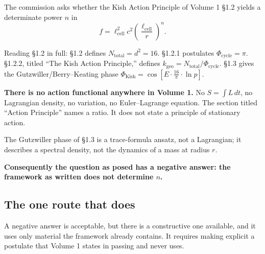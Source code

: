 \documentclass[11pt,letterpaper]{article}
\newcommand{\kgeo}{k_{\mathrm{geo}}}
\newcommand{\lcell}{\ell_{\mathrm{cell}}}
\begin{document}
The commission asks whether the Kish Action Principle of Volume 1 \S1.2 yields a determinate
power $n$ in
\begin{equation}
f = \lcell^2 c^2 \left(\frac{\lcell}{r}\right)^{n}.
\label{eq:power}
\end{equation}

Reading \S1.2 in full: \S1.2 defines $N_{\mathrm{total}} = d^2 = 16$. \S1.2.1 postulates
$\Phi_{\mathrm{cycle}} = \pi$. \S1.2.2, titled ``The Kish Action Principle,'' defines
$\kgeo = N_{\mathrm{total}}/\Phi_{\mathrm{cycle}}$. \S1.3 gives the Gutzwiller/Berry--Keating
phase $\Phi_{\mathrm{Kish}} = \cos[E \cdot \tfrac{16}{\pi} \cdot \ln p]$.

\begin{negbox}
\textbf{There is no action functional anywhere in Volume 1.} No $S = \int L\,dt$, no
Lagrangian density, no variation, no Euler--Lagrange equation. The section titled ``Action
Principle'' names a ratio. It does not state a principle of stationary action.

\medskip
\noindent The Gutzwiller phase of \S1.3 is a trace-formula ansatz, not a Lagrangian; it
describes a spectral density, not the dynamics of a mass at radius $r$.

\medskip
\noindent \textbf{Consequently the question as posed has a negative answer: the framework as
written does not determine $n$.}
\end{negbox}

\subsection{The one route that does}

A negative answer is acceptable, but there is a constructive one available, and it uses only
material the framework already contains. It requires making explicit a postulate that Volume 1
states in passing and never uses.
\end{document}
